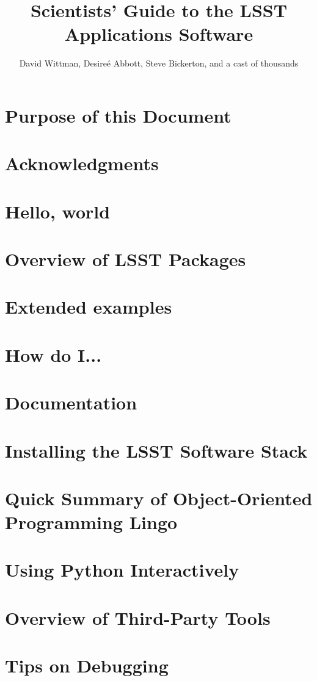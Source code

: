 \documentclass[oneside]{book}
\title{Scientists' Guide to the LSST Applications Software}
\author{David Wittman, Desire\'{e} Abbott, Steve Bickerton, and a cast of thousands}
\begin{document}
\maketitle

\chapter*{Purpose of this Document\label{chap-purpose}}


\chapter*{Acknowledgments\label{chap-acknowledgements}}



\chapter{Hello, world\label{chap-hello}}


\chapter{Overview of LSST Packages\label{chap-overview}}



\chapter{Extended examples\label{chap-examples}}


\chapter{How do I...\label{chap-howto}}


\chapter{Documentation\label{chap-doc}}


%
% 



\appendix

\chapter{Installing the LSST Software Stack\label{appendix-stackinstall}}


\chapter{Quick Summary of Object-Oriented Programming Lingo\label{appendix-lingo}}


\chapter{Using Python Interactively\label{appendix-interactivePython}}


\chapter{Overview of Third-Party Tools\label{appendix-thirdparty}}


\chapter{Tips on Debugging\label{appendix-debugging}}

\end{document}
